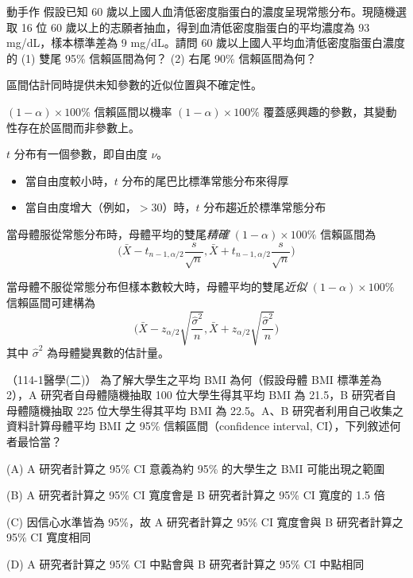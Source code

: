     \bigskip

    \begin{custom}{動手作}
        假設已知 60 歲以上國人血清低密度脂蛋白的濃度呈現常態分布。現隨機選取 16 位 60 歲以上的志願者抽血，得到血清低密度脂蛋白的平均濃度為 93 mg/dL，樣本標準差為 9 mg/dL。請問 60 歲以上國人平均血清低密度脂蛋白濃度的 (1) 雙尾 95\% 信賴區間為何？ (2) 右尾 90\% 信賴區間為何？
    \end{custom}

    \answerbox{330pt}

    \begin{takehome}
        \item 區間估計同時提供未知參數的近似位置與不確定性。
        \item $(1-\alpha) \times 100\%$ 信賴區間以機率 $(1-\alpha) \times 100\%$ 覆蓋感興趣的參數，其變動性存在於區間而非參數上。
        \item $t$ 分布有一個參數，即自由度 $\nu$。
        \begin{itemize}
            \item 當自由度較小時，$t$ 分布的尾巴比標準常態分布來得厚
            \item 當自由度增大（例如，$>30$）時，$t$ 分布趨近於標準常態分布
        \end{itemize}
        \item 當母體服從常態分布時，母體平均的雙尾\textit{精確} $(1-\alpha) \times 100\%$ 信賴區間為
        \[\Bigg(\bar{X} - t_{n-1, \alpha/2} \frac{s}{\sqrt{n}}, \bar{X} + t_{n-1, \alpha/2} \frac{s}{\sqrt{n}}\Bigg)\]
        \item 當母體不服從常態分布但樣本數較大時，母體平均的雙尾\textit{近似} $(1-\alpha) \times 100\%$ 信賴區間可建構為
        \[\Bigg(\bar{X} - z_{\alpha/2} \sqrt{\frac{\hat{\sigma}^2}{n}}, \bar{X} + z_{\alpha/2} \sqrt{\frac{\hat{\sigma}^2}{n}}\Bigg)\]
        其中 $\hat{\sigma}^2$ 為母體變異數的估計量。
    \end{takehome}

    \bigskip
    
    \begin{docexam}{（114-1醫學(二)）}
        為了解大學生之平均 BMI 為何（假設母體 BMI 標準差為 2），A 研究者自母體隨機抽取 100 位大學生得其平均 BMI 為 21.5，B 研究者自母體隨機抽取 225 位大學生得其平均 BMI 為 22.5。A、B 研究者利用自己收集之資料計算母體平均 BMI 之 95\% 信賴區間（confidence interval, CI），下列敘述何者最恰當？

        (A) A 研究者計算之 95\% CI 意義為約 95\% 的大學生之 BMI 可能出現之範圍

        (B) A 研究者計算之 95\% CI 寬度會是 B 研究者計算之 95\% CI 寬度的 1.5 倍

        (C) 因信心水準皆為 95\%，故 A 研究者計算之 95\% CI 寬度會與 B 研究者計算之 95\% CI 寬度相同

        (D) A 研究者計算之 95\% CI 中點會與 B 研究者計算之 95\% CI 中點相同
    \end{docexam}

